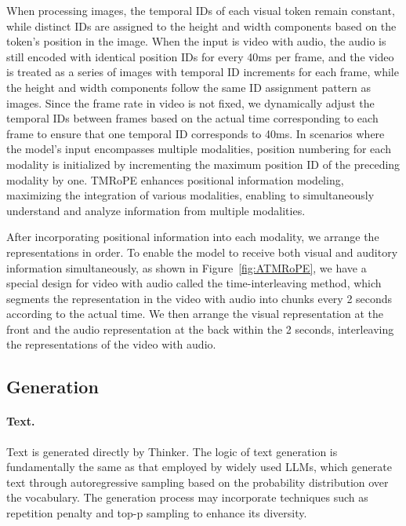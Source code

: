 When processing images, the temporal IDs of each visual token remain constant, while distinct IDs are assigned to the height and width components based on the token’s position in the image. When the input is video with audio, the audio is still encoded with identical position IDs for every 40ms per frame, and the video is treated as a series of images with temporal ID increments for each frame, while the height and width components follow the same ID assignment pattern as images. Since the frame rate in video is not fixed, we dynamically adjust the temporal IDs between frames based on the actual time corresponding to each frame to ensure that one temporal ID corresponds to 40ms. In scenarios where the model’s input encompasses multiple modalities, position numbering for each modality is initialized by incrementing the maximum position ID of the preceding modality by one. TMRoPE enhances positional information modeling, maximizing the integration of various modalities, enabling \method to simultaneously understand and analyze information from multiple modalities.

After incorporating positional information into each modality, we arrange the representations in order. To enable the model to receive both visual and auditory information simultaneously, as shown in Figure~\ref{fig:ATMRoPE}, we have a special design for video with audio called the time-interleaving method, which segments the representation in the video with audio into chunks every 2 seconds according to the actual time. We then arrange the visual representation at the front and the audio representation at the back within the 2 seconds, interleaving the representations of the video with audio.

\subsection{Generation}
\paragraph{Text.} Text is generated directly by Thinker. The logic of text generation is fundamentally the same as that employed by widely used LLMs, which generate text through autoregressive sampling based on the probability distribution over the vocabulary. The generation process may incorporate techniques such as repetition penalty and top-p sampling to enhance its diversity.

